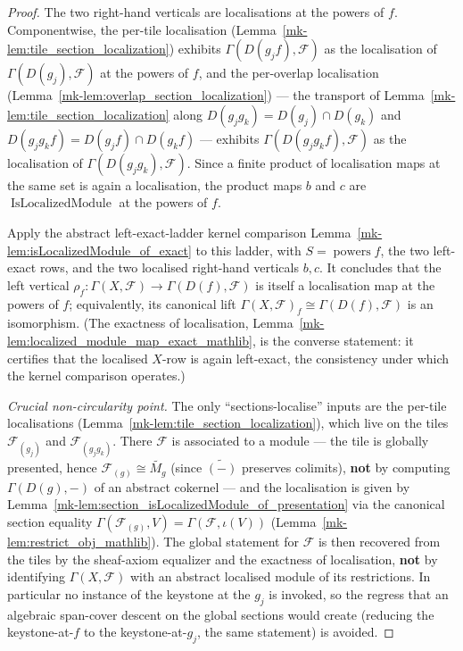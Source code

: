 \begin{proof}
  The two right-hand verticals are localisations at the powers of \(f\). Componentwise, the per-tile
  localisation (Lemma~\ref{mk-lem:tile_section_localization}) exhibits \(\Gamma(D(g_j f), \mathcal{F})\) as
  the localisation of \(\Gamma(D(g_j), \mathcal{F})\) at the powers of \(f\), and the per-overlap
  localisation (Lemma~\ref{mk-lem:overlap_section_localization}) — the transport of
  Lemma~\ref{mk-lem:tile_section_localization} along \(D(g_j g_k) = D(g_j) \cap D(g_k)\) and
  \(D(g_j g_k f) = D(g_j f) \cap D(g_k f)\) — exhibits \(\Gamma(D(g_j g_k f), \mathcal{F})\) as the
  localisation of \(\Gamma(D(g_j g_k), \mathcal{F})\). Since a finite product of localisation maps at the
  same set is again a localisation, the product maps \(b\) and \(c\) are
  \(\operatorname{IsLocalizedModule}\) at the powers of \(f\).

  Apply the abstract left-exact-ladder kernel comparison
  Lemma~\ref{mk-lem:isLocalizedModule_of_exact} to this ladder, with \(S = \operatorname{powers} f\), the
  two left-exact rows, and the two localised right-hand verticals \(b, c\). It concludes that the left
  vertical \(\rho_f : \Gamma(X, \mathcal{F}) \to \Gamma(D(f), \mathcal{F})\) is itself a localisation map
  at the powers of \(f\); equivalently, its canonical lift \(\Gamma(X, \mathcal{F})_f \cong
  \Gamma(D(f), \mathcal{F})\) is an isomorphism. (The exactness of localisation,
  Lemma~\ref{mk-lem:localized_module_map_exact_mathlib}, is the converse statement: it certifies that the
  localised \(X\)-row is again left-exact, the consistency under which the kernel comparison operates.)

  \emph{Crucial non-circularity point.} The only ``sections-localise'' inputs are the per-tile
  localisations (Lemma~\ref{mk-lem:tile_section_localization}), which live on the tiles
  \(\mathcal{F}_{(g_j)}\) and \(\mathcal{F}_{(g_j g_k)}\). There \(\mathcal{F}\) is associated to a
  module — the tile is globally presented, hence \(\mathcal{F}_{(g)} \cong \widetilde{M_g}\) (since
  \(\widetilde{(-)}\) preserves colimits), \textbf{not} by computing \(\Gamma(D(g), -)\) of an abstract
  cokernel — and the localisation is given by
  Lemma~\ref{mk-lem:section_isLocalizedModule_of_presentation} via the canonical section
  equality \(\Gamma(\mathcal{F}_{(g)}, V) = \Gamma(\mathcal{F}, \iota(V))\)
  (Lemma~\ref{mk-lem:restrict_obj_mathlib}). The global statement for \(\mathcal{F}\) is then recovered
  from the tiles by the sheaf-axiom equalizer and the exactness of localisation, \textbf{not} by
  identifying \(\Gamma(X, \mathcal{F})\) with an abstract localised module of its restrictions. In
  particular no instance of the keystone at the \(g_j\) is invoked, so the regress that an algebraic
  span-cover descent on the global sections would create (reducing the keystone-at-\(f\) to the
  keystone-at-\(g_j\), the same statement) is avoided.
\end{proof}

